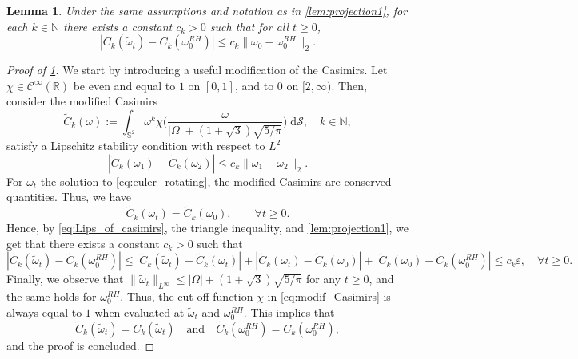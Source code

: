 \documentclass{amsart}
\newtheorem{lemma}{Lemma}[section]
\newtheorem{lemma}{Lemma}[section]  %
\def\erre{{\mathbb{R}}}
\def\enne{{\mathbb{N}}}
\begin{document}
\begin{lemma}\label{lem:projection2}
    Under the same assumptions and notation as in \cref{lem:projection1}, for each $k \in \mathbb{N}$ there exists a constant $c_k > 0$ such that for all $t \geq 0$,
    \[
        \left| C_k(\tilde\omega_t) - C_k(\omega_0^{RH}) \right| \leq c_k \|\omega_0 - \omega_0^{RH}\|_2.
    \]
\end{lemma}
\begin{proof}[Proof of \cref{lem:projection2}]
We start by introducing a useful modification of the Casimirs. Let $\chi\in\mathcal{C}^\infty(\erre)$ be even and equal to $1$ on $[0,1]$, and to $0$ on $[2,\infty)$. Then, consider the modified Casimirs
\begin{equation}
    \tilde{C}_k(\omega):=\int_{\mathbb{S}^2}\omega^k\chi\biggl(\frac{\omega}{|\Omega|+(1+\sqrt{3})\sqrt{5/\pi}}\biggr)\;\mathrm{d}\mathcal{S},\quad k\in\enne,
    \label{eq:modif_Casimirs}
\end{equation}
satisfy a Lipschitz stability condition with respect to $L^2$
\begin{equation}
    |\tilde{C}_k(\omega_1)-\tilde{C}_k(\omega_2)|\leq c_k \|\omega_1-\omega_2\|_2.
    \label{eq:Lips_of_casimirs}
\end{equation}
For $\omega_t$ the solution to \eqref{eq:euler_rotating}, the modified Casimirs are conserved quantities. Thus, we have
$$
\tilde{C}_k(\omega_t)=\tilde{C}_k(\omega_0), \qquad   \forall t\geq0.
$$
Hence, by \eqref{eq:Lips_of_casimirs}, the triangle inequality, and \cref{lem:projection1}, we get that there exists a constant $c_k>0$ such that
$$
|\tilde{C}_k(\tilde{\omega}_t)-\tilde{C}_k(\omega^{RH}_0)|\le |\tilde{C}_k(\tilde{\omega}_t)-\tilde{C}_k(\omega_t)|+|\tilde{C}_k(\omega_t)-\tilde{C}_k(\omega_0)| +|\tilde{C}_k(\omega_0)-\tilde{C}_k(\omega^{RH}_0)|\leq c_k\varepsilon,\quad\forall t\geq0.
$$
Finally, we observe that $\|\tilde\omega_t\|_{L^\infty}\leq |\Omega|+(1+\sqrt{3})\sqrt{5/\pi}$ for any $t\geq0$, and the same holds for $\omega_0^{RH}$. Thus, the cut-off function $\chi$ in \eqref{eq:modif_Casimirs} is always equal to $1$ when evaluated at $\tilde\omega_t$ and $\omega_0^{RH}$. This implies that
$$\tilde{C}_k(\tilde{\omega}_t)=C_k(\tilde{\omega}_t)\quad\text{and}\quad \tilde{C}_k(\omega_0^{RH})=C_k(\omega_0^{RH}),$$
and the proof is concluded.
\end{proof}
\end{document}
